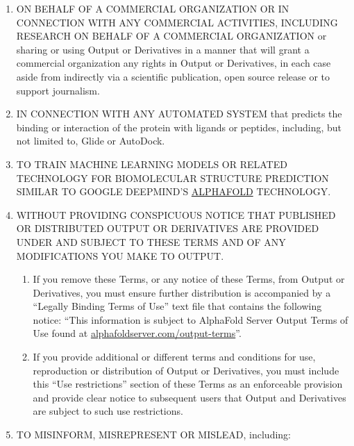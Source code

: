 \documentclass[
]{article}
\providecommand{\tightlist}{%
  \setlength{\itemsep}{0pt}\setlength{\parskip}{0pt}}
\begin{document}
\begin{enumerate}
\def\labelenumi{\arabic{enumi}.}
\tightlist
\item
  ON BEHALF OF A COMMERCIAL ORGANIZATION OR IN CONNECTION WITH ANY
  COMMERCIAL ACTIVITIES, INCLUDING RESEARCH ON BEHALF OF A COMMERCIAL
  ORGANIZATION or sharing or using Output or Derivatives in a manner
  that will grant a commercial organization any rights in Output or
  Derivatives, in each case aside from indirectly via a scientific
  publication, open source release or to support journalism.
\item
  IN CONNECTION WITH ANY AUTOMATED SYSTEM that predicts the binding or
  interaction of the protein with ligands or peptides, including, but
  not limited to, Glide or AutoDock.
\item
  TO TRAIN MACHINE LEARNING MODELS OR RELATED TECHNOLOGY FOR
  BIOMOLECULAR STRUCTURE PREDICTION SIMILAR TO GOOGLE DEEPMIND'S
  \href{https://deepmind.google/technologies/alphafold/}{ALPHAFOLD}
  TECHNOLOGY.
\item
  WITHOUT PROVIDING CONSPICUOUS NOTICE THAT PUBLISHED OR DISTRIBUTED
  OUTPUT OR DERIVATIVES ARE PROVIDED UNDER AND SUBJECT TO THESE TERMS
  AND OF ANY MODIFICATIONS YOU MAKE TO OUTPUT.

  \begin{enumerate}
  \def\labelenumii{\arabic{enumii}.}
  \tightlist
  \item
    If you remove these Terms, or any notice of these Terms, from Output
    or Derivatives, you must ensure further distribution is accompanied
    by a ``Legally Binding Terms of Use'' text file that contains the
    following notice: ``This information is subject to AlphaFold Server
    Output Terms of Use found at
    \href{https://alphafoldserver.com/output-terms}{alphafoldserver.com/output-terms}''.
  \item
    If you provide additional or different terms and conditions for use,
    reproduction or distribution of Output or Derivatives, you must
    include this ``Use restrictions'' section of these Terms as an
    enforceable provision and provide clear notice to subsequent users
    that Output and Derivatives are subject to such use restrictions.
  \end{enumerate}
\item
  TO MISINFORM, MISREPRESENT OR MISLEAD, including:


\end{enumerate}
\end{document}
